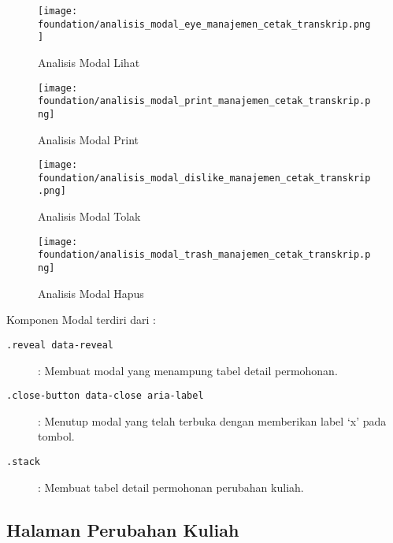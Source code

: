 \begin{figure} [H]
	\centering  
	\texttt{[image: foundation/analisis\_modal\_eye\_manajemen\_cetak\_transkrip.png]}
	\caption{Analisis Modal Lihat} 
\end{figure}
\begin{figure} [H]
	\centering  
	\texttt{[image: foundation/analisis\_modal\_print\_manajemen\_cetak\_transkrip.png]}
	\caption{Analisis Modal Print} 
\end{figure}
\begin{figure} [H]
	\centering  
	\texttt{[image: foundation/analisis\_modal\_dislike\_manajemen\_cetak\_transkrip.png]}
	\caption{Analisis Modal Tolak} 
\end{figure}
\begin{figure} [H]
	\centering  
	\texttt{[image: foundation/analisis\_modal\_trash\_manajemen\_cetak\_transkrip.png]}
	\caption{Analisis Modal Hapus} 
\end{figure}
Komponen Modal terdiri dari :
\begin{description}
	\item [\texttt{.reveal data-reveal}] : Membuat modal yang menampung tabel detail permohonan.
	\item [\texttt{.close-button data-close aria-label}] : Menutup modal yang telah terbuka dengan memberikan label `x' pada tombol.
	\item [\texttt{.stack}] :	Membuat tabel detail permohonan perubahan kuliah.
\end{description}


\subsection{Halaman Perubahan Kuliah}
